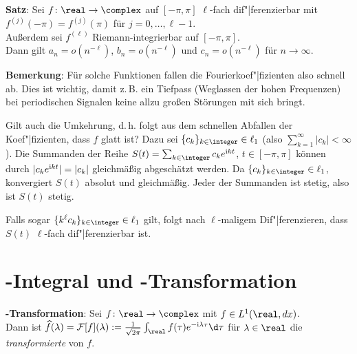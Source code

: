 \linie

\textbf{Satz}:
Sei $f\colon \real \rightarrow \complex$ auf $[-\pi, \pi]$
$\ell$-fach dif"|ferenzierbar mit
$f^{(j)}(-\pi) = f^{(j)}(\pi)$ für $j = 0, \dotsc, \ell - 1$.\\
Außerdem sei $f^{(\ell)}$ Riemann-integrierbar auf $[-\pi, \pi]$.\\
Dann gilt $a_n = o(n^{-\ell})$,
$b_n = o(n^{-\ell})$ und
$c_n = o(n^{-\ell})$ für $n \to \infty$.

\textbf{Bemerkung}:
Für solche Funktionen fallen die Fourierkoef"|fizienten also schnell ab.
Dies ist wichtig, damit z.\,B. ein Tiefpass
(Weglassen der hohen Frequenzen) bei periodischen Signalen keine
allzu großen Störungen mit sich bringt.

\linie

Gilt auch die Umkehrung, d.\,h. folgt aus dem schnellen Abfallen der
Koef"|fizienten, dass $f$ glatt ist?
Dazu sei $\{c_k\}_{k \in \integer} \in \ell_1$
(also $\sum_{k=1}^\infty |c_k| < \infty$).
Die Summanden der Reihe $S(t) = \sum_{k \in \integer} c_k e^{\i kt}$,
$t \in [-\pi, \pi]$ können durch
$|c_k e^{\mathrm{i} k t}| = |c_k|$ gleichmäßig abgeschätzt werden.
Da $\{c_k\}_{k \in \integer} \in \ell_1$, konvergiert $S(t)$ absolut und
gleichmäßig.
Jeder der Summanden ist stetig,
also ist $S(t)$ stetig.

Falls sogar $\{k^\ell c_k\}_{k \in \integer} \in \ell_1$ gilt,
folgt nach $\ell$-maligem Dif"|ferenzieren, dass
$S(t)$ $\ell$-fach dif"|ferenzierbar ist.

\pagebreak

\section{%
    -Integral und -Transformation%
}

\textbf{-Transformation}:
Sei $f\colon \real \rightarrow \complex$ mit $f \in L^1(\real, dx)$.\\
Dann ist $\widehat{f}(\lambda) = \F[f](\lambda) :=
\frac{1}{\sqrt{2\pi}} \int_\real f(\tau) e^{-\i \lambda\tau} \d\tau$
für $\lambda \in \real$ die \emph{transformierte} von $f$.

